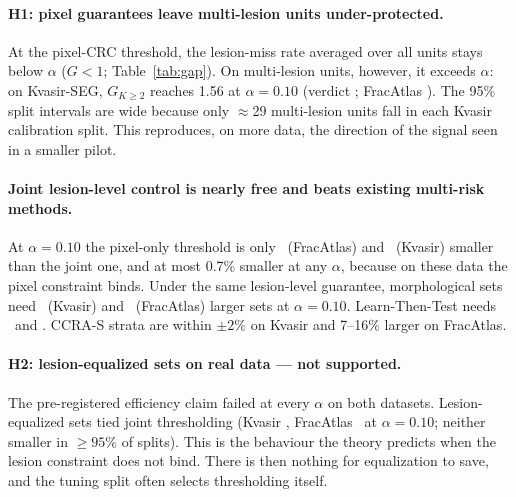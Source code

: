 \paragraph{H1: pixel guarantees leave multi-lesion units under-protected.}
At the pixel-CRC threshold, the lesion-miss rate averaged over all units stays
below $\alpha$ ($G<1$; Table~\ref{tab:gap}). On multi-lesion units, however, it
exceeds $\alpha$: on Kvasir-SEG, $G_{K\ge2}$ reaches 1.56 at $\alpha=0.10$
(verdict \KvasirSegHOne; FracAtlas \FracatlasHOne). The 95\% split intervals are
wide because only $\approx$29 multi-lesion units fall in each Kvasir calibration
split. This reproduces, on more data, the direction of the signal seen in a
smaller pilot.

\begin{table}[t]\centering\scriptsize
\caption{Gap $G=R^{\mathrm{les}}(\hat\lambda^{\mathrm{pix}})/\alpha$ on test units,
with 95\% split intervals.}\label{tab:gap}

\end{table}

\paragraph{Joint lesion-level control is nearly free and beats existing multi-risk methods.}
At $\alpha=0.10$ the pixel-only threshold is only \FracatlasPixelCrcRel\ (FracAtlas) and \KvasirSegPixelCrcRel\ (Kvasir) smaller than the joint one, and
at most 0.7\% smaller at any $\alpha$, because on these data the pixel
constraint binds. Under the same
lesion-level guarantee, morphological sets need \KvasirSegUnionDilationRel\
(Kvasir) and \FracatlasUnionDilationRel\ (FracAtlas) larger sets at
$\alpha=0.10$. Learn-Then-Test needs \KvasirSegLttThresholdRel\ and
\FracatlasLttThresholdRel. CCRA-S strata are within $\pm2\%$ on Kvasir and 7--16\%
larger on FracAtlas.

\paragraph{H2: lesion-equalized sets on real data --- not supported.}
The pre-registered efficiency claim failed at every $\alpha$ on both datasets.
Lesion-equalized sets tied joint thresholding (Kvasir \KvasirSegOursUnionRel,
FracAtlas \FracatlasOursUnionRel\ at $\alpha=0.10$; neither smaller in $\ge95\%$
of splits). This is the behaviour the theory predicts when the lesion constraint
does not bind. There is then nothing for equalization to save, and the tuning
split often selects thresholding itself.

